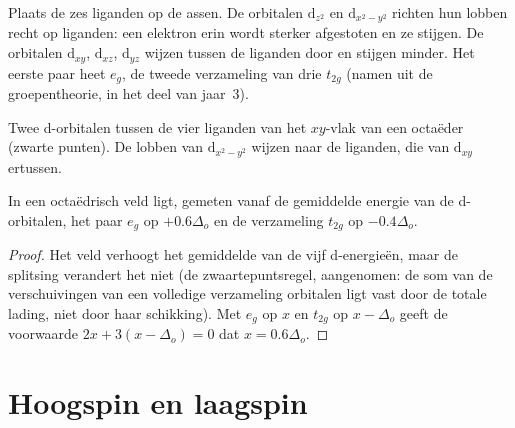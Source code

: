 Plaats de zes liganden op de assen. De orbitalen $\mathrm d_{z^2}$ en $\mathrm d_{x^2-y^2}$
richten hun lobben recht op liganden: een elektron erin wordt sterker afgestoten
en ze stijgen. De orbitalen $\mathrm d_{xy}$, $\mathrm d_{xz}$, $\mathrm d_{yz}$ wijzen tussen
de liganden door en stijgen minder. Het eerste paar heet $e_g$, de tweede verzameling van drie
$t_{2g}$ (namen uit de groepentheorie, in het deel van jaar~3).

\begin{omfigure}

{\small Twee d-orbitalen tussen de vier liganden van het $xy$-vlak van een octaëder
(zwarte punten). De lobben van $\mathrm d_{x^2-y^2}$ wijzen naar de liganden, die van
$\mathrm d_{xy}$ ertussen.}
\end{omfigure}

\begin{theorem}[Zwaartepunt]\label{thm:b2:ligand-field:barycentre}
In een octaëdrisch veld ligt, gemeten vanaf de gemiddelde energie van de d-orbitalen, het
paar $e_g$ op $+0.6\Delta_o$ en de verzameling $t_{2g}$ op $-0.4\Delta_o$.
\end{theorem}

\begin{proof}
Het veld verhoogt het gemiddelde van de vijf d-energieën, maar de splitsing verandert het
niet (de zwaartepuntsregel, aangenomen: de som van de verschuivingen van een volledige verzameling
orbitalen ligt vast door de totale lading, niet door haar schikking). Met $e_g$ op $x$ en
$t_{2g}$ op $x - \Delta_o$ geeft de voorwaarde $2x + 3(x - \Delta_o) = 0$ dat $x = 0.6\Delta_o$.
\end{proof}

\section{Hoogspin en laagspin}

